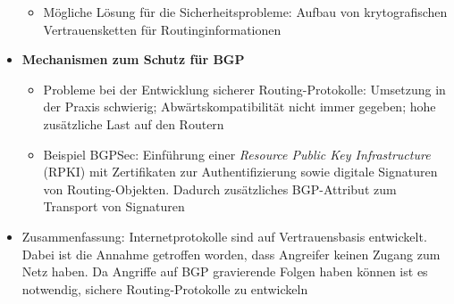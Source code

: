 \begin{itemize}
\begin{itemize}
		\item Mögliche Lösung für die Sicherheitsprobleme: Aufbau von krytografischen Vertrauensketten für Routinginformationen
	\end{itemize}
	\item \textbf{Mechanismen zum Schutz für BGP}
	\begin{itemize}
		\item Probleme bei der Entwicklung sicherer Routing-Protokolle: Umsetzung in der Praxis schwierig; Abwärtskompatibilität nicht immer gegeben; hohe zusätzliche Last auf den Routern
		\item Beispiel BGPSec: Einführung einer \textit{Resource Public Key Infrastructure} (RPKI) mit Zertifikaten zur Authentifizierung sowie digitale Signaturen von Routing-Objekten. Dadurch zusätzliches BGP-Attribut zum Transport von Signaturen
	\end{itemize}
	\item Zusammenfassung: Internetprotokolle sind auf Vertrauensbasis entwickelt. Dabei ist die Annahme getroffen worden, dass Angreifer keinen Zugang zum Netz haben. Da Angriffe auf BGP gravierende Folgen haben können ist es notwendig, sichere Routing-Protokolle zu entwickeln
\end{itemize}


